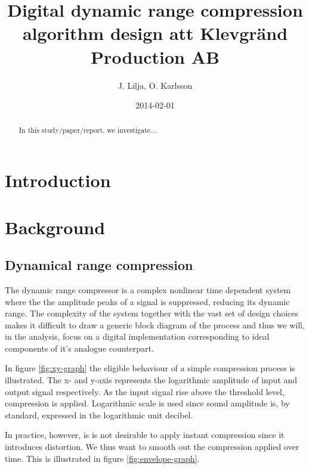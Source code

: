 \documentclass[]{article}
\begin{document}
\title{Digital dynamic range compression algorithm design att Klevgränd Production AB}
\author{J. Lilja, O. Karlsson}
\date{2014-02-01}
\maketitle

\begin{abstract}
In this study/paper/report, we investigate...
\end{abstract}

\clearpage
\section{Introduction}
\section{Background}
\subsection{Dynamical range compression}
The dynamic range compressor is a complex nonlinear time dependent system where the the amplitude peaks of a signal is suppressed, reducing its dynamic range. The complexity of the system together with the vast set of design choices makes it difficult to draw a generic block diagram of the process\cite{giannoullis}  and thus we will, in the analysis, focus on a digital implementation corresponding to ideal components of it's analogue counterpart. 

In figure \ref{fig:xy-graph} the eligible behaviour of a simple compression process is illustrated. The x- and y-axis represents the logarithmic amplitude of input and output signal respectively. As the input signal rise above the threshold level, compression is applied. Logarithmic scale is used since sound amplitude is, by standard, expressed in the logarithmic unit decibel.

In practice, however, is is not desirable to apply instant compression since it introduces distortion\cite{giannoullis}. We thus want to smooth out the compression applied over time. This is illustrated in figure \ref{fig:envelope-graph}.

%
%
\end{document}
